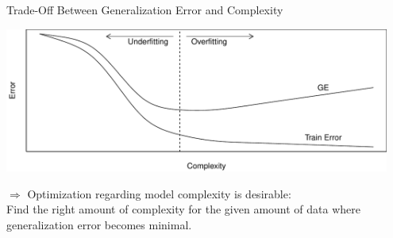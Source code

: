 \begin{vbframe}{Trade-Off Between Generalization Error and Complexity}


\lz
\begin{knitrout}\scriptsize
{}\color{fgcolor}

{\centering \includegraphics[width=0.95\textwidth]{figure/eval_ofit_3} 

}



\end{knitrout}

\lz
$\Rightarrow$ Optimization regarding model complexity is desirable:\\ 
Find the right amount of complexity for the given amount of data where generalization error becomes minimal.

\end{vbframe}

\endlecture

